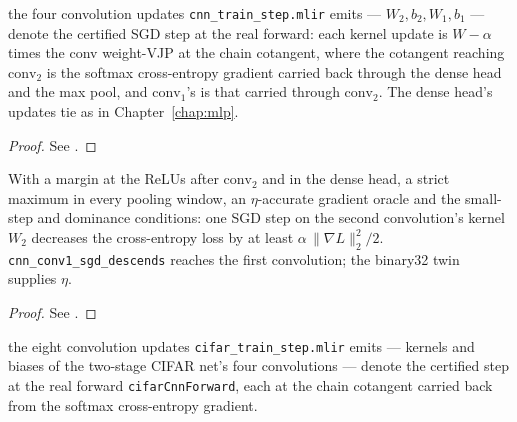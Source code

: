 \begin{theorem}
  \label{thm:cnn_fold}
  \leanok
  \Prove{} the four convolution updates \texttt{cnn\_train\_step.mlir} emits
  --- \(W_2, b_2, W_1, b_1\) --- denote the certified SGD step at the real
  forward: each kernel update is \(W - \alpha\) times the conv weight-VJP at
  the chain cotangent, where the cotangent reaching \(\mathrm{conv}_2\) is the
  softmax cross-entropy gradient carried back through the dense head and the
  max pool, and \(\mathrm{conv}_1\)'s is that carried through \(\mathrm{conv}_2\).
  The dense head's updates tie as in Chapter~\ref{chap:mlp}.
\end{theorem}

\begin{proof}
\leanok
See .
\end{proof}

\begin{theorem}
  \label{thm:cnn_sgd_descends}
  \leanok
  With a margin at the ReLUs after \(\mathrm{conv}_2\) and in the dense head, a
  strict maximum in every pooling window, an \(\eta\)-accurate gradient oracle
  and the small-step and dominance conditions: \Prove{} one SGD step on the
  second convolution's kernel \(W_2\) decreases the cross-entropy loss by at
  least \(\alpha\,\|\nabla L\|_2^2/2\). \texttt{cnn\_conv1\_sgd\_descends}
  reaches the first convolution; the binary32 twin supplies \(\eta\).
\end{theorem}

\begin{proof}
\leanok
See .
\end{proof}

\begin{theorem}
  \label{thm:cifar_fold}
  \leanok
  \Prove{} the eight convolution updates \texttt{cifar\_train\_step.mlir}
  emits --- kernels and biases of the two-stage CIFAR net's four convolutions
  --- denote the certified step at the real forward \texttt{cifarCnnForward},
  each at the chain cotangent carried back from the softmax cross-entropy
  gradient.
\end{theorem}

